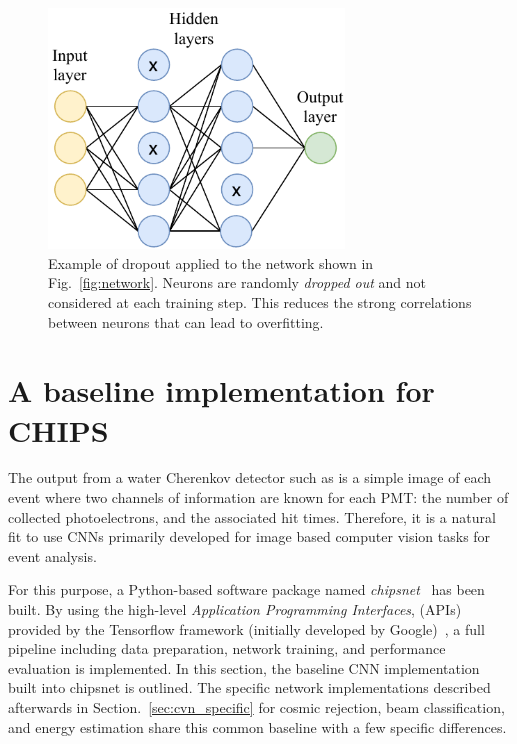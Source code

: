 \begin{figure} %
    \includegraphics[width=0.7\textwidth]{diagrams/6-cvn/dropout.pdf}
    \caption[Illustration of dropout.]
    {Example of dropout applied to the network shown in Fig.~\ref{fig:network}. Neurons are
        randomly \emph{dropped out} and not considered at each training step. This reduces the
        strong correlations between neurons that can lead to overfitting.}
    \label{fig:dropout}
\end{figure}

\section{A baseline implementation for CHIPS} %
\label{sec:cvn_baseline} %

The output from a water Cherenkov detector such as \chips is a simple image of each event where
two channels of information are known for each PMT: the number of collected photoelectrons, and
the associated hit times. Therefore, it is a natural fit to use CNNs primarily developed for image
based computer vision tasks for \chips event analysis.

For this purpose, a Python-based software package named \emph{chipsnet}~\cite{chipsnet2020} has
been built. By using the high-level \emph{Application Programming Interfaces}, (APIs) provided by
the Tensorflow framework (initially developed by Google)~\cite{tf2015}, a full pipeline including
data preparation, network training, and performance evaluation is implemented. In this section,
the baseline CNN implementation built into chipsnet is outlined. The specific network
implementations described afterwards in Section.~\ref{sec:cvn_specific} for cosmic rejection, beam
classification, and energy estimation share this common baseline with a few specific differences.

